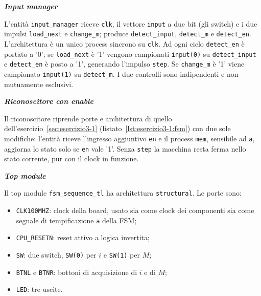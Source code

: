 
\medskip\noindent\textbf{\textit{Input manager}}

L'entità \texttt{input\_manager} riceve \texttt{clk}, il vettore \texttt{input} a due bit (gli switch) e i due impulsi \texttt{load\_next} e \texttt{change\_m}; produce \texttt{detect\_input}, \texttt{detect\_m} e \texttt{detect\_en}. L'architettura è un unico process sincrono su \texttt{clk}. Ad ogni ciclo \texttt{detect\_en} è portato a '0'; se \texttt{load\_next} è '1' vengono campionati \texttt{input(0)} su \texttt{detect\_input} e \texttt{detect\_en} è posto a '1', generando l'impulso \texttt{step}. Se \texttt{change\_m} è '1' viene campionato \texttt{input(1)} su \texttt{detect\_m}. I due controlli sono indipendenti e non mutuamente esclusivi.


\medskip\noindent\textbf{\textit{Riconoscitore con enable}}

Il riconoscitore riprende porte e architettura di quello dell'esercizio~\ref{sec:esercizio3-1} (listato~\ref{lst:esercizio3-1:fsm}) con due sole modifiche: l'entità riceve l'ingresso aggiuntivo \texttt{en} e il process \texttt{mem}, sensibile ad \texttt{a}, aggiorna lo stato solo se \texttt{en} vale '1'. Senza \texttt{step} la macchina resta ferma nello stato corrente, pur con il clock in funzione.





\medskip\noindent\textbf{\textit{Top module}}

Il top module \texttt{fsm\_sequence\_tl} ha architettura \texttt{structural}. Le porte sono:

\begin{itemize}
  \item \texttt{CLK100MHZ}: clock della board, usato sia come clock dei componenti sia come segnale di tempificazione \texttt{a} della FSM;
  \item \texttt{CPU\_RESETN}: reset attivo a logica invertita;
  \item \texttt{SW}: due switch, \texttt{SW(0)} per $i$ e \texttt{SW(1)} per $M$;
  \item \texttt{BTNL} e \texttt{BTNR}: bottoni di acquisizione di $i$ e di $M$;
  \item \texttt{LED}: tre uscite.
\end{itemize}

